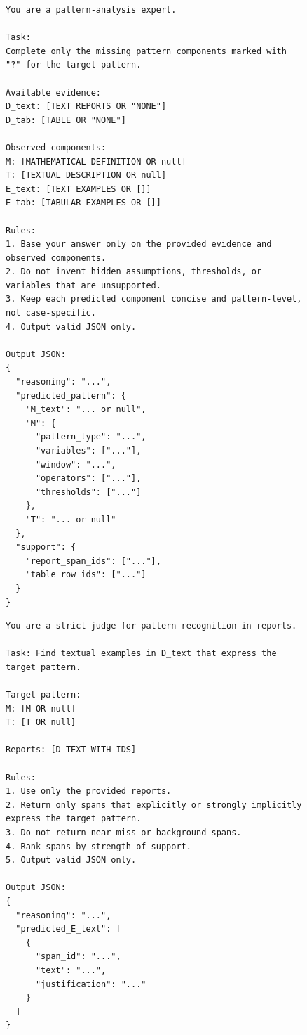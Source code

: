 \documentclass[sigconf,nonacm,anonymous]{acmart}
\begin{document}
\begin{figure}[h]
\begin{promptbox}\small
\begin{prompt}

\begin{verbatim}
You are a pattern-analysis expert.

Task:
Complete only the missing pattern components marked with "?" for the target pattern.

Available evidence:
D_text: [TEXT REPORTS OR "NONE"]
D_tab: [TABLE OR "NONE"]

Observed components:
M: [MATHEMATICAL DEFINITION OR null]
T: [TEXTUAL DESCRIPTION OR null]
E_text: [TEXT EXAMPLES OR []]
E_tab: [TABULAR EXAMPLES OR []]

Rules:
1. Base your answer only on the provided evidence and observed components.
2. Do not invent hidden assumptions, thresholds, or variables that are unsupported.
3. Keep each predicted component concise and pattern-level, not case-specific.
4. Output valid JSON only.

Output JSON:
{
  "reasoning": "...",
  "predicted_pattern": {
    "M_text": "... or null",
    "M": {
      "pattern_type": "...",
      "variables": ["..."],
      "window": "...",
      "operators": ["..."],
      "thresholds": ["..."]
    },
    "T": "... or null"
  },
  "support": {
    "report_span_ids": ["..."],
    "table_row_ids": ["..."]
  }
}
\end{verbatim}
\end{prompt}
\end{promptbox}
\end{figure}

\begin{figure}[h]
\begin{promptbox}\small
\begin{prompt}
\begin{verbatim}
You are a strict judge for pattern recognition in reports.

Task: Find textual examples in D_text that express the target pattern.

Target pattern:
M: [M OR null]
T: [T OR null]

Reports: [D_TEXT WITH IDS]

Rules:
1. Use only the provided reports.
2. Return only spans that explicitly or strongly implicitly express the target pattern.
3. Do not return near-miss or background spans.
4. Rank spans by strength of support.
5. Output valid JSON only.

Output JSON:
{
  "reasoning": "...",
  "predicted_E_text": [
    {
      "span_id": "...",
      "text": "...",
      "justification": "..."
    }
  ]
}
\end{verbatim}
\end{prompt}
\end{promptbox}
\end{figure}
\end{document}
